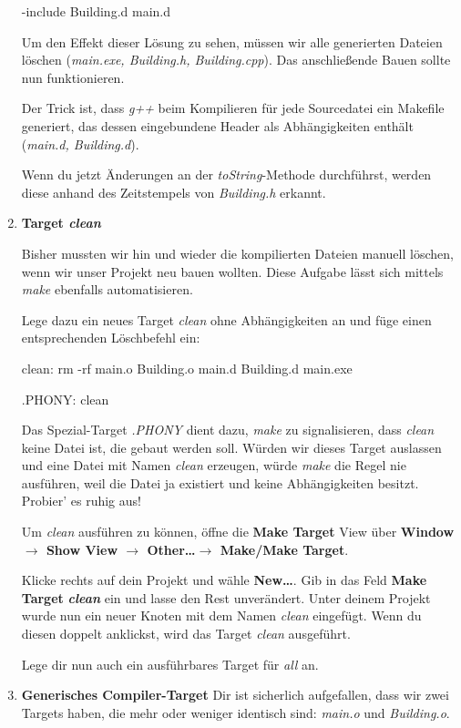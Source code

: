 \begin{enumerate}
\begin{lstmake}
-include Building.d main.d
\end{lstmake}

Um den Effekt dieser Lösung zu sehen, müssen wir alle generierten Dateien löschen (\emph{main.exe, Building.h, Building.cpp}).
Das anschließende Bauen sollte nun funktionieren.

Der Trick ist, dass \emph{g++} beim Kompilieren für jede Sourcedatei ein Makefile generiert, das dessen eingebundene Header als Abhängigkeiten enthält (\emph{main.d, Building.d}).

Wenn du jetzt Änderungen an der \emph{toString}-Methode durchführst, werden diese anhand des Zeitstempels von \emph{Building.h} erkannt.




\item\textbf{Target \emph{clean}}

Bisher mussten wir hin und wieder die kompilierten Dateien manuell löschen, wenn wir unser Projekt neu bauen wollten.
Diese Aufgabe lässt sich mittels \emph{make} ebenfalls automatisieren.

Lege dazu ein neues Target \emph{clean} ohne Abhängigkeiten an und füge einen entsprechenden Löschbefehl ein:
\begin{lstmake}
clean:
	rm -rf main.o Building.o main.d Building.d main.exe

.PHONY: clean
\end{lstmake}
Das Spezial-Target \emph{.PHONY} dient dazu, \emph{make} zu signalisieren, dass \emph{clean} keine Datei ist, die gebaut werden soll.
Würden wir dieses Target auslassen und eine Datei mit Namen \emph{clean} erzeugen, würde \emph{make} die Regel nie ausführen, weil die Datei ja existiert und keine Abhängigkeiten besitzt.
Probier' es ruhig aus!

Um \emph{clean} ausführen zu können, öffne die \textbf{Make Target} View über \textbf{Window $\to$ Show View $\to$ Other\dots $\to$ Make/Make Target}.

Klicke rechts auf dein Projekt und wähle \textbf{New\dots}.
Gib in das Feld \textbf{Make Target} \textbf{\emph{clean}} ein und lasse den Rest unverändert.
Unter deinem Projekt wurde nun ein neuer Knoten mit dem Namen \emph{clean} eingefügt.
Wenn du diesen doppelt anklickst, wird das Target \emph{clean} ausgeführt.

Lege dir nun auch ein ausführbares Target für \emph{all} an.





\item\textbf{Generisches Compiler-Target}
Dir ist sicherlich aufgefallen, dass wir zwei Targets haben, die mehr oder weniger identisch sind: \emph{main.o} und \emph{Building.o}.


\end{enumerate}
